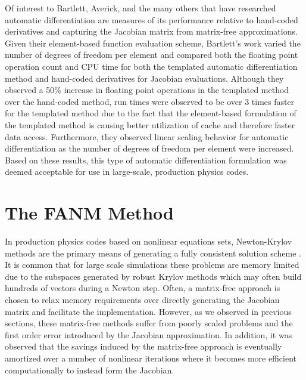 Of interest to Bartlett, Averick, and the many others that have
researched automatic differentiation are measures of its performance
relative to hand-coded derivatives and capturing the Jacobian matrix
from matrix-free approximations. Given their element-based function
evaluation scheme, Bartlett's work varied the number of degrees of
freedom per element and compared both the floating point operation
count and CPU time for both the templated automatic differentiation
method and hand-coded derivatives for Jacobian evaluations. Although
they observed a 50\% increase in floating point operations in the
templated method over the hand-coded method, run times were observed
to be over 3 times faster for the templated method due to the fact
that the element-based formulation of the templated method is causing
better utilization of cache and therefore faster data
access. Furthermore, they observed linear scaling behavior for
automatic differentiation as the number of degrees of freedom per
element were increased. Based on these results, this type of automatic
differentiation formulation was deemed acceptable for use in
large-scale, production physics codes.

\section{The FANM Method\ }
\label{sec:fanm}
In production physics codes based on nonlinear equations sets,
Newton-Krylov methods are the primary means of generating a fully
consistent solution scheme
\citep{evans_development_2006,evans_enhanced_2007,gaston_parallel_2009,godoy_parallel_2012}. It
is common that for large scale simulations these problems are memory
limited due to the subspaces generated by robust Krylov methods which
may often build hundreds of vectors during a Newton step. Often, a
matrix-free approach is chosen to relax memory requirements over
directly generating the Jacobian matrix and facilitate the
implementation. However, as we observed in previous sections, these
matrix-free methods suffer from poorly scaled problems and the first
order error introduced by the Jacobian approximation. In addition, it
was observed that the savings induced by the matrix-free approach is
eventually amortized over a number of nonlinear iterations where it
becomes more efficient computationally to instead form the Jacobian.

